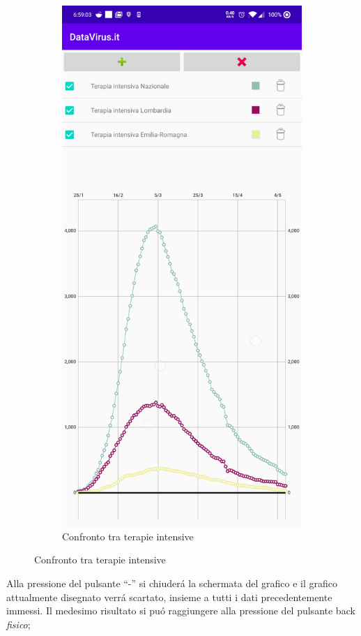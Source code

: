 \documentclass{article}
\newcommand{\quotes}[1]{``#1''}
\begin{document}
\begin{figure}[h]
\begin{subfigure}{.5\textwidth}
        \includegraphics[width=.8\linewidth]{chart_ICU.jpg}
        \caption{Confronto tra terapie intensive}
        \label{fig5:sub2}
      \end{subfigure}
    \end{figure}
    Alla pressione del pulsante \quotes{-} si chiuderá la schermata del grafico e il grafico attualmente disegnato verrá scartato, insieme a tutti i dati precedentemente immessi.
    Il medesimo risultato si puó raggiungere alla pressione del pulsante back \emph{fisico};
\end{document}
